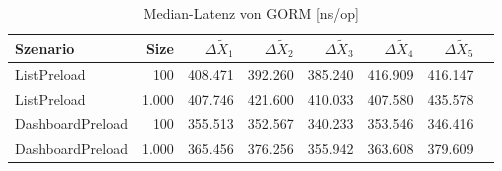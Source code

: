 
\begin{table}[ht]
\setlength{\extrarowheight}{-1pt}
\centering
\caption{Median-Latenz von GORM [ns/op]}
\begin{tabular}{lrrrrrrr}
\toprule
Szenario & Size & ${\Delta \tilde{X}_1}$ & ${\Delta \tilde{X}_2}$ & ${\Delta \tilde{X}_3}$ & ${\Delta \tilde{X}_4}$ & ${\Delta \tilde{X}_5}$ \\
\midrule
	ListPreload & 100 & \cellcolor{red!23}  408.471 & \cellcolor{red!26}  392.260 & \cellcolor{red!24}  385.240 & \cellcolor{red!24}  416.909 & \cellcolor{red!24}  416.147 \\
	ListPreload & 1.000 & \cellcolor{red!21}  407.746 & \cellcolor{red!23}  421.600 & \cellcolor{red!25}  410.033 & \cellcolor{red!24}  407.580 & \cellcolor{red!23}  435.578 \\
	DashboardPreload & 100 & \cellcolor{red!10}  355.513 & \cellcolor{red!12}  352.567 & \cellcolor{red!8}  340.233 & \cellcolor{red!8}  353.546 & \cellcolor{red!9}  346.416 \\
	DashboardPreload & 1.000 & \cellcolor{red!8}  365.456 & \cellcolor{red!10}  376.256 & \cellcolor{red!11}  355.942 & \cellcolor{red!11}  363.608 & \cellcolor{red!10}  379.609 \\
\bottomrule
\end{tabular}
\label{tab:latenz_gorm}
\end{table}
	